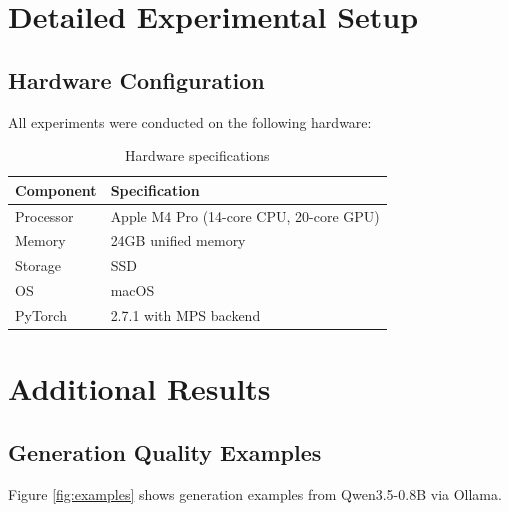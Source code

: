 \documentclass[11pt,a4paper]{article}
\begin{document}



\appendix

\section{Detailed Experimental Setup}

\subsection{Hardware Configuration}

All experiments were conducted on the following hardware:

\begin{table}[h]
\centering
\caption{Hardware specifications}
\label{tab:hardware}
\begin{tabular}{ll}
\toprule
\textbf{Component} & \textbf{Specification} \\
\midrule
Processor & Apple M4 Pro (14-core CPU, 20-core GPU) \\
Memory & 24GB unified memory \\
Storage & SSD \\
OS & macOS \\
PyTorch & 2.7.1 with MPS backend \\
\bottomrule
\end{tabular}
\end{table}



\section{Additional Results}



\subsection{Generation Quality Examples}

Figure \ref{fig:examples} shows generation examples from Qwen3.5-0.8B via Ollama.
\end{document}

